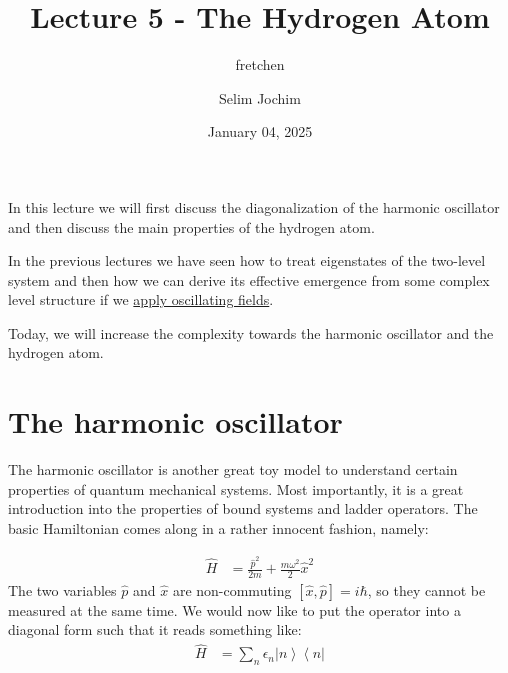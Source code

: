 \documentclass[10pt]{article}
\renewenvironment{abstract}
  {{\bfseries\noindent{\abstractname}\par\nobreak}\footnotesize}
  {\bigskip}
\newcommand{\bra}[1]{\ensuremath{\left\langle#1\right|}}
\newcommand{\ket}[1]{\ensuremath{\left|#1\right\rangle}}
\begin{document}
\title{Lecture 5 - The Hydrogen Atom}



\author[1]{fretchen}%
\author[2]{Selim Jochim}%
%
%


\vspace{-1em}



  
  \date{January 04, 2025}


\begingroup
\let\center\flushleft
\let\endcenter\endflushleft
\maketitle
\endgroup





\begin{abstract}
In this lecture we will first discuss the diagonalization of the harmonic oscillator and then discuss the main properties of the hydrogen atom.%
\end{abstract}%



\sloppy


In the previous lectures we have seen how to treat eigenstates of the two-level system and then how we can derive its effective emergence from some complex level structure if we \href{https://www.authorea.com/users/143341/articles/326506-lecture-4-atoms-in-oscillating-fields}{apply oscillating fields}.

Today, we will increase the complexity towards the harmonic oscillator and the hydrogen atom.


\section{The harmonic oscillator}

The harmonic oscillator is another great toy model to understand certain properties of quantum mechanical systems. Most importantly, it is a great introduction into the properties of bound systems and ladder operators. The basic Hamiltonian comes along in a rather innocent fashion, namely:

\begin{align}\label{Eq:HamHO}
\hat{H} &= \frac{\hat{p}^2}{2m}+ \frac{m\omega^2}{2}\hat{x}^2
\end{align}
The two variables $\hat{p}$ and $\hat{x}$ are non-commuting $[\hat{x}, \hat{p}] = i\hbar$, so they cannot be measured at the same time. We would now like to put the operator into a diagonal form such that it reads something like:
\begin{align}\label{Eq:HamHO}
\hat{H} &= \sum_n \epsilon_n \ket{n}\bra{n}
\end{align}
\end{document}
